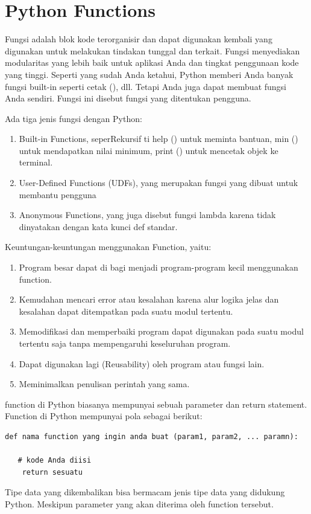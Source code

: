 \section{Python Functions}
Fungsi adalah blok kode terorganisir dan dapat digunakan kembali yang digunakan untuk melakukan tindakan tunggal dan terkait. Fungsi menyediakan modularitas yang lebih baik untuk aplikasi Anda dan tingkat penggunaan kode yang tinggi. Seperti yang sudah Anda ketahui, Python memberi Anda banyak fungsi built-in seperti cetak (), dll. Tetapi Anda juga dapat membuat fungsi Anda sendiri. Fungsi ini disebut fungsi yang ditentukan pengguna. 

Ada tiga jenis fungsi dengan Python: 
\begin{enumerate}
\item Built-in Functions, seperRekursif ti help () untuk meminta bantuan, min () untuk mendapatkan nilai minimum, print () untuk mencetak objek ke terminal.
\item User-Defined Functions (UDFs), yang merupakan fungsi yang dibuat untuk membantu pengguna
\item Anonymous Functions, yang juga disebut fungsi lambda karena tidak dinyatakan dengan kata kunci def standar.
\end{enumerate}

Keuntungan-keuntungan menggunakan Function, yaitu: 
\begin{enumerate}
\item Program besar dapat di bagi menjadi program-program kecil menggunakan function.
\item Kemudahan mencari error atau kesalahan karena alur logika jelas dan kesalahan dapat ditempatkan pada suatu modul tertentu.
\item Memodifikasi dan memperbaiki program dapat digunakan pada suatu modul tertentu saja tanpa mempengaruhi keseluruhan program.
\item Dapat digunakan lagi (Reusability) oleh program atau fungsi lain.
\item Meminimalkan penulisan perintah yang sama. 
\end{enumerate}

function di Python biasanya mempunyai sebuah parameter dan return statement. Function di Python mempunyai pola sebagai berikut:
\begin{verbatim}
def nama function yang ingin anda buat (param1, param2, ... paramn):
   
   # kode Anda diisi
    return sesuatu
\end{verbatim}    
Tipe data yang dikembalikan bisa bermacam jenis tipe data yang didukung Python. Meskipun parameter yang akan diterima oleh function tersebut. 

